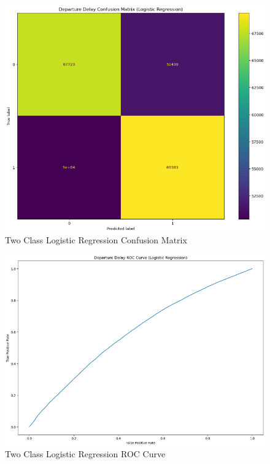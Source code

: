 \documentclass[a4paper,12pt]{article}
\begin{document}
\begin{figure}
    \centering
    \includegraphics*[scale=.50]{../../img/model_rq2_cfmtrx_1.png}
    \caption[]{Two Class Logistic Regression Confusion Matrix}
    \label{fig:model:rq2:cfmtrx}
\end{figure}

\begin{figure}
    \centering
    \includegraphics*[scale=.45]{../../img/model_rq2_roc.png}
    \caption[]{Two Class Logistic Regression ROC Curve}
    \label{fig:model:rq2:ROC}
\end{figure}
\end{document}
